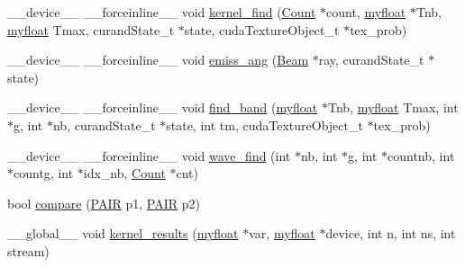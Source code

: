 \begin{DoxyCompactItemize}
\item 
\+\_\+\+\_\+device\+\_\+\+\_\+ \+\_\+\+\_\+forceinline\+\_\+\+\_\+ void \hyperlink{mc__gpu_8cu_a69a74cd79ab6ec3f9048693e61fc31e4}{kernel\+\_\+find} (\hyperlink{classCount}{Count} $\ast$count, \hyperlink{param_8h_a5f097c9f3873af7be7fc156e6a06ca5e}{myfloat} $\ast$Tnb, \hyperlink{param_8h_a5f097c9f3873af7be7fc156e6a06ca5e}{myfloat} Tmax, curand\+State\+\_\+t $\ast$state, cuda\+Texture\+Object\+\_\+t $\ast$tex\+\_\+prob)
\item 
\+\_\+\+\_\+device\+\_\+\+\_\+ \+\_\+\+\_\+forceinline\+\_\+\+\_\+ void \hyperlink{mc__gpu_8cu_a371d09f214d1f9af7f47717c97ec18b0}{emiss\+\_\+ang} (\hyperlink{definitions_8h_a784616beaf04e11707aff8fd62ce0b8b}{Beam} $\ast$ray, curand\+State\+\_\+t $\ast$state)
\item 
\+\_\+\+\_\+device\+\_\+\+\_\+ \+\_\+\+\_\+forceinline\+\_\+\+\_\+ void \hyperlink{mc__gpu_8cu_a44d098df49e84e1042008b6299d5a9d1}{find\+\_\+band} (\hyperlink{param_8h_a5f097c9f3873af7be7fc156e6a06ca5e}{myfloat} $\ast$Tnb, \hyperlink{param_8h_a5f097c9f3873af7be7fc156e6a06ca5e}{myfloat} Tmax, int $\ast$g, int $\ast$nb, curand\+State\+\_\+t $\ast$state, int tm, cuda\+Texture\+Object\+\_\+t $\ast$tex\+\_\+prob)
\item 
\+\_\+\+\_\+device\+\_\+\+\_\+ \+\_\+\+\_\+forceinline\+\_\+\+\_\+ void \hyperlink{mc__gpu_8cu_a2adfcce7b6d9986ea7ac4a40fa99b910}{wave\+\_\+find} (int $\ast$nb, int $\ast$g, int $\ast$countnb, int $\ast$countg, int $\ast$idx\+\_\+nb, \hyperlink{classCount}{Count} $\ast$cnt)
\item 
bool \hyperlink{mc__gpu_8cu_ae7878c7cabc4f92516def54a8b2ae0ab}{compare} (\hyperlink{structPAIR}{P\+A\+IR} p1, \hyperlink{structPAIR}{P\+A\+IR} p2)
\item 
\+\_\+\+\_\+global\+\_\+\+\_\+ void \hyperlink{mc__gpu_8cu_a172551f61a20c0c530fa3fd3d7ce6eca}{kernel\+\_\+results} (\hyperlink{param_8h_a5f097c9f3873af7be7fc156e6a06ca5e}{myfloat} $\ast$var, \hyperlink{param_8h_a5f097c9f3873af7be7fc156e6a06ca5e}{myfloat} $\ast$device, int n, int ns, int stream)
\end{DoxyCompactItemize}
